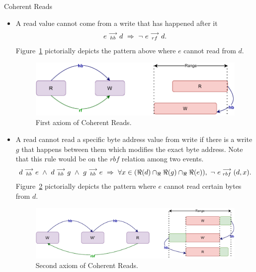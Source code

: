 \begin{axiom}{Coherent Reads}
            \begin{itemize}
                \item A read value cannot come from a write that has happened after it 
                    \begin{align*}
                        \reln{e}{hb}{d}\ \Rightarrow{}\ \neg \ \reln{e}{rf}{d}.
                    \end{align*}
                    Figure~\ref{model:coherent_reads(1)} pictorially depicts the pattern above where $e$ cannot read from $d$.
                    \begin{figure}[H]
                        \centering
                        \includegraphics[scale=0.7]{3.ECMAScriptMemoryModel/CoherentReads1.pdf}
                        \caption{First axiom of Coherent Reads.}
                        \label{model:coherent_reads(1)}
                    \end{figure}
                \item A read cannot read a specific byte address value from write if there is a write $g$ that happens between them which modifies the exact byte address. Note that this rule would be on the $rbf$ relation among two events. 
                    \begin{align*}
                        \reln{d}{hb}{e}
                        \ \wedge \ 
                        \reln{d}{hb}{g} \ \wedge \  \reln{g}{hb}{e}
                        \ \Rightarrow{} \
                        \forall x \in (\Re(d) \cap_\Re \Re(g) \cap_\Re \Re(e)), \ \neg \ \reln{e}{rbf}{(d,x)}.
                    \end{align*}
                    Figure~\ref{model:coherent_reads(2)} pictorially depicts the pattern where $e$ cannot read certain bytes from $d$. 
                    \begin{figure}[H]
                        \centering 
                        \includegraphics[scale=0.7]{3.ECMAScriptMemoryModel/CoherentReads2.pdf}
                        \caption{Second axiom of Coherent Reads.}
                        \label{model:coherent_reads(2)}
                    \end{figure}
                            
            \end{itemize}
        \end{axiom}
